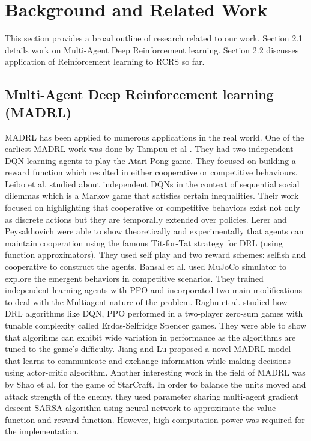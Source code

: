 \documentclass[12pt]{report}
\begin{document}
\chapter{Background and Related Work}                       

This section provides a broad outline of research related to our work. Section 2.1 details work on Multi-Agent Deep Reinforcement learning. Section 2.2 discusses application of Reinforcement learning to RCRS so far. 

\section{Multi-Agent Deep Reinforcement learning (MADRL)}

MADRL has been applied to numerous applications in the real world. One of the earliest MADRL work was done by Tampuu et al \cite{Tampuu}. They had two independent DQN learning agents to play the Atari Pong game. They focused on building a reward function which resulted in either cooperative or competitive behaviours. Leibo et al. \cite{Leibo} studied about independent DQNs in the context of sequential social dilemmas which is a Markov game that satisfies certain inequalities. Their work focused on highlighting that cooperative or competitive behaviors exist not only as discrete actions but they are temporally extended over policies. Lerer and Peysakhovich \cite{Lerer} were able to show theoretically and experimentally that agents can maintain cooperation using the famous Tit-for-Tat strategy for DRL (using function approximators). They used self play and two reward schemes: selfish and cooperative to construct the agents. Bansal et al. \cite{Bansal} used MuJoCo simulator to explore the emergent behaviors in competitive scenarios. They trained independent learning agents with PPO and incorporated two main modifications to deal with the Multiagent nature of the problem. Raghu et al. \cite{Raghu} studied how DRL algorithms like DQN, PPO performed in a two-player zero-sum games with tunable complexity called Erdos-Selfridge Spencer games. They were able to show that algorihms can exhibit wide variation in performance as the algorithms are tuned to the game's difficulty. Jiang and Lu \cite{Jiang} proposed a novel MADRL model that learns to communicate and exchange information while making decisions using actor-critic algorithm. Another interesting work in the field of MADRL was by Shao et al. \cite{Shao} for the game of StarCraft. In order to balance the units moved and attack strength of the enemy, they used parameter sharing multi-agent gradient descent SARSA algorithm using neural network to approximate the value function and reward function. However, high computation power was required for the implementation. 
\end{document}
